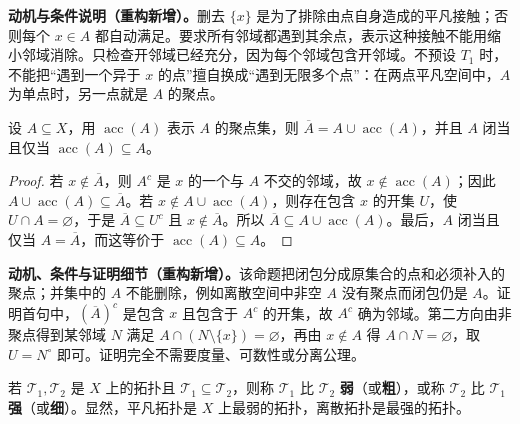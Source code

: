 \documentclass[../../main.tex]{subfiles}%
\begin{document}
\begin{remark}
\textbf{动机与条件说明（重构新增）。}删去 $\{x\}$ 是为了排除由点自身造成的平凡接触；否则每个 $x\in A$ 都自动满足。要求所有邻域都遇到其余点，表示这种接触不能用缩小邻域消除。只检查开邻域已经充分，因为每个邻域包含开邻域。不预设 $T_1$ 时，不能把“遇到一个异于 $x$ 的点”擅自换成“遇到无限多个点”：在两点平凡空间中，$A$ 为单点时，另一点就是 $A$ 的聚点。
\end{remark}
\begin{proposition}\label{proposition:ch04-closure-accumulation}
设 $A\subseteq X$，用 $\operatorname{acc}(A)$ 表示 $A$ 的聚点集，则 $\overline A=A\cup\operatorname{acc}(A)$，并且 $A$ 闭当且仅当 $\operatorname{acc}(A)\subseteq A$。
\end{proposition}
\begin{proof}
若 $x\notin\overline A$，则 $A^c$ 是 $x$ 的一个与 $A$ 不交的邻域，故 $x\notin\operatorname{acc}(A)$；因此 $A\cup\operatorname{acc}(A)\subseteq\overline A$。若 $x\notin A\cup\operatorname{acc}(A)$，则存在包含 $x$ 的开集 $U$，使 $U\cap A=\varnothing$，于是 $\overline A\subseteq U^c$ 且 $x\notin\overline A$。所以 $\overline A\subseteq A\cup\operatorname{acc}(A)$。最后，$A$ 闭当且仅当 $A=\overline A$，而这等价于 $\operatorname{acc}(A)\subseteq A$。
\end{proof}
\begin{remark}
\textbf{动机、条件与证明细节（重构新增）。}该命题把闭包分成原集合的点和必须补入的聚点；并集中的 $A$ 不能删除，例如离散空间中非空 $A$ 没有聚点而闭包仍是 $A$。证明首句中，$(\overline A)^c$ 是包含 $x$ 且包含于 $A^c$ 的开集，故 $A^c$ 确为邻域。第二方向由非聚点得到某邻域 $N$ 满足 $A\cap(N\setminus\{x\})=\varnothing$，再由 $x\notin A$ 得 $A\cap N=\varnothing$，取 $U=N^\circ$ 即可。证明完全不需要度量、可数性或分离公理。
\end{remark}
\begin{definition}[较弱与较强的拓扑]\label{definition:ch04-weaker-stronger}
若 $\mathcal T_1,\mathcal T_2$ 是 $X$ 上的拓扑且 $\mathcal T_1\subseteq\mathcal T_2$，则称 $\mathcal T_1$ 比 $\mathcal T_2$ \textbf{弱}（或\textbf{粗}），或称 $\mathcal T_2$ 比 $\mathcal T_1$ \textbf{强}（或\textbf{细}）。显然，平凡拓扑是 $X$ 上最弱的拓扑，离散拓扑是最强的拓扑。
\end{definition}
\end{document}
